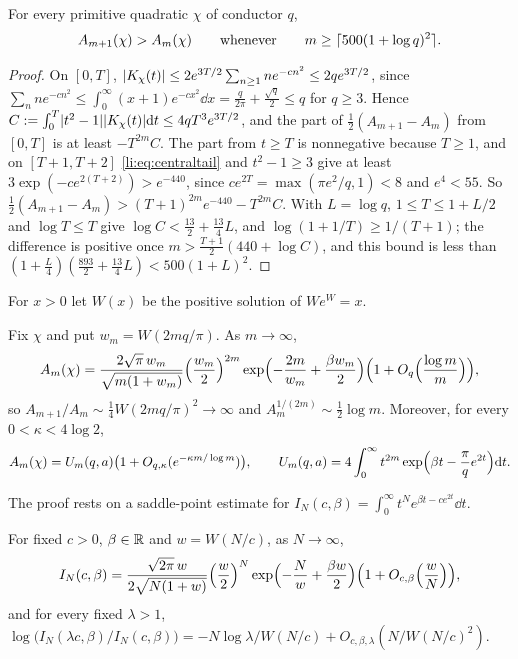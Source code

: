\begin{theorem}\label{li:thm:centralincrease}
For every primitive quadratic $\chi$ of conductor $q$,
\[
 A_{m+1}(\chi)>A_m(\chi)\qquad\text{whenever}\qquad m\ge\lceil500(1+\log q)^2\rceil.
\]
\end{theorem}

\begin{proof}
On $[0,T]$, $\lvert K_\chi(t)\rvert\le2e^{3T/2}\sum_{n\ge1}ne^{-cn^2}\le2qe^{3T/2}$, since
$\sum_nne^{-cn^2}\le\int_0^\infty(x+1)e^{-cx^2}\dd x=\frac q{2\pi}+\frac{\sqrt q}2\le q$ for $q\ge3$. Hence
$C:=\int_0^T\lvert t^2-1\rvert\lvert K_\chi(t)\rvert\mathrm{d} t\le4qT^3e^{3T/2}$, and the part of $\frac12(A_{m+1}-A_m)$ from $[0,T]$ is
at least $-T^{2m}C$. The part from $t\ge T$ is nonnegative because $T\ge1$, and on $[T+1,T+2]$
\eqref{li:eq:centraltail} and $t^2-1\ge3$ give at least $3\exp(-ce^{2(T+2)})>e^{-440}$, since
$ce^{2T}=\max(\pi e^2/q,1)<8$ and $e^4<55$. So $\frac12(A_{m+1}-A_m)>(T+1)^{2m}e^{-440}-T^{2m}C$. With
$L=\log q$, $1\le T\le1+L/2$ and $\log T\le T$ give $\log C<\frac{13}2+\frac{13}4L$, and
$\log(1+1/T)\ge1/(T+1)$; the difference is positive once
$m>\frac{T+1}2(440+\log C)$, and this bound is less than
$(1+\frac L4)(\frac{893}2+\frac{13}4L)<500(1+L)^2$.
\end{proof}

For $x>0$ let $W(x)$ be the positive solution of $We^W=x$.

\begin{theorem}\label{li:thm:centralasymp}
Fix $\chi$ and put $w_m=W(2mq/\pi)$. As $m\to\infty$,
\[
 A_m(\chi)=\frac{2\sqrt\pi\,w_m}{\sqrt{m(1+w_m)}}\Bigl(\frac{w_m}2\Bigr)^{2m}
 \exp\Bigl(-\frac{2m}{w_m}+\frac{\beta w_m}2\Bigr)\Bigl(1+O_q\Bigl(\frac{\log m}m\Bigr)\Bigr),
\]
so $A_{m+1}/A_m\sim\frac14W(2mq/\pi)^2\to\infty$ and $A_m^{1/(2m)}\sim\frac12\log m$. Moreover, for every
$0<\kappa<4\log2$,
\[
 A_m(\chi)=U_m(q,a)\bigl(1+O_{q,\kappa}(e^{-\kappa m/\log m})\bigr),\qquad
 U_m(q,a)=4\int_0^\infty t^{2m}\exp\Bigl(\beta t-\frac\pi qe^{2t}\Bigr)\mathrm{d} t.
\]
\end{theorem}

The proof rests on a saddle-point estimate for $I_N(c,\beta)=\int_0^\infty t^Ne^{\beta t-ce^{2t}}\dd t$.

\begin{lemma}\label{li:lem:centralsaddle}
For fixed $c>0$, $\beta\in\mathbb{R}$ and $w=W(N/c)$, as $N\to\infty$,
\[
 I_N(c,\beta)=\frac{\sqrt{2\pi}\,w}{2\sqrt{N(1+w)}}\Bigl(\frac w2\Bigr)^N
 \exp\Bigl(-\frac Nw+\frac{\beta w}2\Bigr)\Bigl(1+O_{c,\beta}\Bigl(\frac wN\Bigr)\Bigr),
\]
and for every fixed $\lambda>1$,
$\log\bigl(I_N(\lambda c,\beta)/I_N(c,\beta)\bigr)=-N\log\lambda/W(N/c)+O_{c,\beta,\lambda}(N/W(N/c)^2)$.
\end{lemma}

